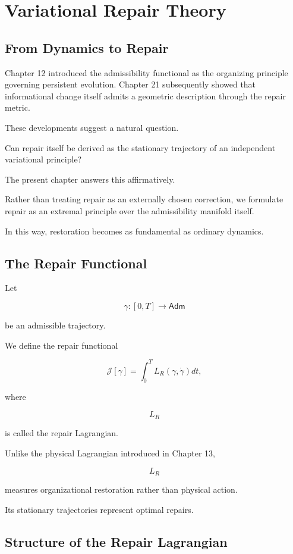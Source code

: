 \documentclass[11pt,oneside]{book}
\numberwithin{equation}{chapter}
\theoremstyle{definition}
\theoremstyle{plain}
\newcommand{\Adm}{\mathsf{Adm}}
\begin{document}
\chapter{Variational Repair Theory}

\section{From Dynamics to Repair}

Chapter 12 introduced the admissibility functional as the organizing
principle governing persistent evolution. Chapter 21 subsequently showed
that informational change itself admits a geometric description through the
repair metric.

These developments suggest a natural question.

Can repair itself be derived as the stationary trajectory of an independent
variational principle?

The present chapter answers this affirmatively.

Rather than treating repair as an externally chosen correction, we formulate
repair as an extremal principle over the admissibility manifold itself.

In this way, restoration becomes as fundamental as ordinary dynamics.

\section{The Repair Functional}

Let

\[
\gamma :
[0,T]
\rightarrow
\Adm
\]

be an admissible trajectory.

We define the repair functional

\[
\mathcal J[\gamma]
=
\int_0^T
L_R
(\gamma,\dot\gamma)
dt,
\]

where

\[
L_R
\]

is called the repair Lagrangian.

Unlike the physical Lagrangian introduced in Chapter 13,

\[
L_R
\]

measures organizational restoration rather than physical action.

Its stationary trajectories represent optimal repairs.

\section{Structure of the Repair Lagrangian}
\end{document}
